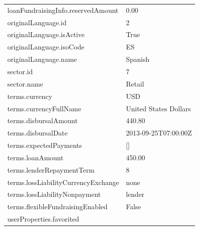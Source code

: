 \begin{longtable}{|p{}|p{}|}
	loanFundraisingInfo.reservedAmount   & 0.00                                                                \\
	originalLanguage.id                  & 2                                                                   \\
	originalLanguage.isActive            & True                                                                \\
	originalLanguage.isoCode             & ES                                                                  \\
	originalLanguage.name                & Spanish                                                             \\
	sector.id                            & 7                                                                   \\
	sector.name                          & Retail                                                              \\
	terms.currency                       & USD                                                                 \\
	terms.currencyFullName               & United States Dollars                                               \\
	terms.disbursalAmount                & 440.80                                                              \\
	terms.disbursalDate                  & 2013-09-25T07:00:00Z                                                \\
	terms.expectedPayments               & {[}{]}                                                              \\
	terms.loanAmount                     & 450.00                                                              \\
	terms.lenderRepaymentTerm            & 8                                                                   \\
	terms.lossLiabilityCurrencyExchange  & none                                                                \\
	terms.lossLiabilityNonpayment        & lender                                                              \\
	terms.flexibleFundraisingEnabled     & False                                                               \\
	userProperties.favorited             &                                                                     \\

\end{longtable}
